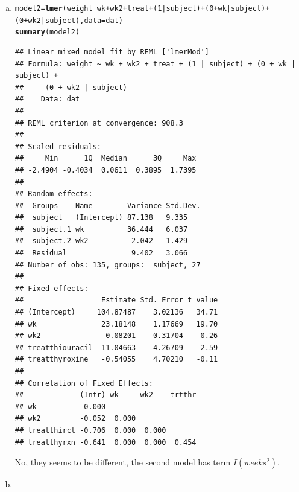 \documentclass{article}\usepackage[]{graphicx}\usepackage[]{color}
\makeatletter
\newcommand{\hlnum}[1]{\textcolor[rgb]{0.686,0.059,0.569}{#1}}%
\newcommand{\hlopt}[1]{\textcolor[rgb]{0,0,0}{#1}}%
\newcommand{\hlstd}[1]{\textcolor[rgb]{0.345,0.345,0.345}{#1}}%
\newcommand{\hlkwb}[1]{\textcolor[rgb]{0.69,0.353,0.396}{#1}}%
\newcommand{\hlkwc}[1]{\textcolor[rgb]{0.333,0.667,0.333}{#1}}%
\newcommand{\hlkwd}[1]{\textcolor[rgb]{0.737,0.353,0.396}{\textbf{#1}}}%
\newenvironment{kframe}{%
 \def\at@end@of@kframe{}%
 \ifinner\ifhmode%
  \def\at@end@of@kframe{\end{minipage}}%
  \begin{minipage}{\columnwidth}%
 \fi\fi%
 \def\FrameCommand##1{\hskip\@totalleftmargin \hskip-\fboxsep
 \colorbox{shadecolor}{##1}\hskip-\fboxsep
     \hskip-\linewidth \hskip-\@totalleftmargin \hskip\columnwidth}%
 \MakeFramed {\advance\hsize-\width
   \@totalleftmargin\z@ \linewidth\hsize
   \@setminipage}}%
 {\par\unskip\endMakeFramed%
 \at@end@of@kframe}
\newenvironment{knitrout}{}{} %
\makeatother
\begin{document}
\begin{enumerate}[(a)]
\begin{knitrout}
\end{knitrout}

\item

\begin{knitrout}
\color{fgcolor}\begin{kframe}
\begin{alltt}
  \hlstd{model2} \hlkwb{=} \hlkwd{lmer}\hlstd{(weight} \hlopt{~} \hlstd{wk} \hlopt{+} \hlstd{wk2} \hlopt{+} \hlstd{treat}  \hlopt{+} \hlstd{(}\hlnum{1}\hlopt{|}\hlstd{subject)}\hlopt{+} \hlstd{(}\hlnum{0} \hlopt{+} \hlstd{wk}\hlopt{|}\hlstd{subject)}\hlopt{+} \hlstd{(}\hlnum{0} \hlopt{+} \hlstd{wk2}\hlopt{|}\hlstd{subject),} \hlkwc{data} \hlstd{= dat )}
  \hlkwd{summary}\hlstd{(model2)}
\end{alltt}
\begin{verbatim}
## Linear mixed model fit by REML ['lmerMod']
## Formula: weight ~ wk + wk2 + treat + (1 | subject) + (0 + wk | subject) +  
##     (0 + wk2 | subject)
##    Data: dat
## 
## REML criterion at convergence: 908.3
## 
## Scaled residuals: 
##     Min      1Q  Median      3Q     Max 
## -2.4904 -0.4034  0.0611  0.3895  1.7395 
## 
## Random effects:
##  Groups    Name        Variance Std.Dev.
##  subject   (Intercept) 87.138   9.335   
##  subject.1 wk          36.444   6.037   
##  subject.2 wk2          2.042   1.429   
##  Residual               9.402   3.066   
## Number of obs: 135, groups:  subject, 27
## 
## Fixed effects:
##                  Estimate Std. Error t value
## (Intercept)     104.87487    3.02136   34.71
## wk               23.18148    1.17669   19.70
## wk2               0.08201    0.31704    0.26
## treatthiouracil -11.04663    4.26709   -2.59
## treatthyroxine   -0.54055    4.70210   -0.11
## 
## Correlation of Fixed Effects:
##             (Intr) wk     wk2    trtthr
## wk           0.000                     
## wk2         -0.052  0.000              
## treatthircl -0.706  0.000  0.000       
## treatthyrxn -0.641  0.000  0.000  0.454
\end{verbatim}
\end{kframe}
\end{knitrout}

\qquad No, they seems to be different, the second model has term $I(weeks^2)$.

\item


\end{enumerate}
\end{document}
